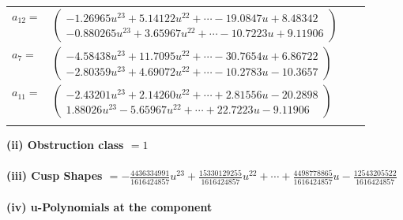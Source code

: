 \documentclass[1p]{elsarticle_modified}
\theoremstyle{definition}
\begin{document}
\begin{tabular}{m{7pt} m{180pt} m{7pt} m{180pt} }
\flushright $a_{12}=$&$\begin{pmatrix}-1.26965 u^{23}+5.14122 u^{22}+\cdots-19.0847 u+8.48342\\-0.880265 u^{23}+3.65967 u^{22}+\cdots-10.7223 u+9.11906\end{pmatrix}$ \\
\flushright $a_{7}=$&$\begin{pmatrix}-4.58438 u^{23}+11.7095 u^{22}+\cdots-30.7654 u+6.86722\\-2.80359 u^{23}+4.69072 u^{22}+\cdots-10.2783 u-10.3657\end{pmatrix}$ \\
\flushright $a_{11}=$&$\begin{pmatrix}-2.43201 u^{23}+2.14260 u^{22}+\cdots+2.81556 u-20.2898\\1.88026 u^{23}-5.65967 u^{22}+\cdots+22.7223 u-9.11906\end{pmatrix}$\\&\end{tabular}
\flushleft \textbf{(ii) Obstruction class $= 1$}\\~\\
\flushleft \textbf{(iii) Cusp Shapes $= -\frac{4436334991}{1616424857} u^{23}+\frac{15330129255}{1616424857} u^{22}+\cdots+\frac{4498778865}{1616424857} u-\frac{12543205522}{1616424857}$}\\~\\
\newpage\renewcommand{\arraystretch}{1}
\flushleft \textbf{(iv) u-Polynomials at the component}\newline \\
\end{document}

